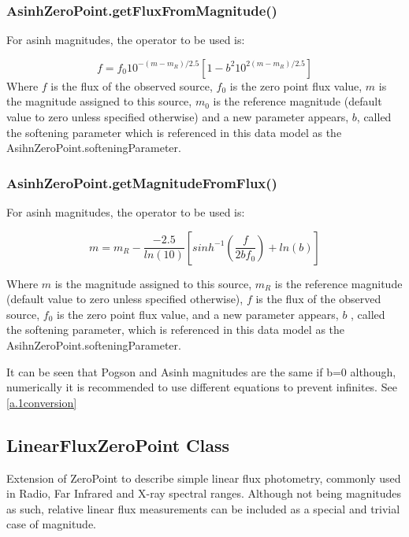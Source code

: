 \documentclass[11pt,a4paper]{ivoa}
\begin{document}

\subsubsection{AsinhZeroPoint.getFluxFromMagnitude()}
For asinh magnitudes, the operator to be used is:\par
\[
f = f_0 10^{-(m-m_R )/2.5} \left[ 1-b^2 10^{2(m-m_R )/2.5}\right]
\]
Where $f$ is the flux of the observed source, $f_0$ is the zero point flux value, $m$ is the magnitude assigned to this source, $m_0$ is the reference magnitude (default value to zero unless specified otherwise) and a new parameter appears, $b$, called the softening parameter which is referenced in this data model as the AsihnZeroPoint.softeningParameter.
\par

\subsubsection{AsinhZeroPoint.getMagnitudeFromFlux()}
For asinh magnitudes, the operator to be used is:\par
\[
m = m_R - \frac{-2.5}{ln(10)}\left[ sinh^{-1}\left (\frac{f}{2bf_0}\right) + ln(b) \right]
\]

Where $m$ is the magnitude assigned to this source, $m_R$ is the reference magnitude (default value to zero unless specified otherwise), $f$ is the flux of the observed source, $f_0$ is the zero point flux value, and a new parameter appears, $b$ , called the softening parameter, which is referenced in this data model as the AsihnZeroPoint.softeningParameter.
\par

It can be seen that Pogson and Asinh magnitudes are the same if b=0 although, numerically it is recommended to use different equations to prevent infinites. See \ref{a.1conversion}
\par

\subsection{LinearFluxZeroPoint Class}
Extension of ZeroPoint  to describe simple linear flux photometry, commonly used in Radio, Far Infrared and X-ray spectral ranges. Although not being magnitudes as such, relative linear flux measurements can be included as a special and trivial case of magnitude.\par
\end{document}
